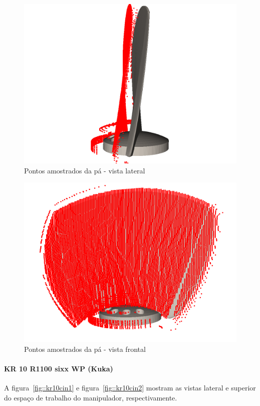 \begin{figure}[h!]	
	\includegraphics[width=\columnwidth]{figs/bighatch/amostrapa1.png}
	\caption{Pontos amostrados da pá - vista lateral}
	\label{fig::amostrapa1}
\end{figure}

\begin{figure}[h!]	
	\includegraphics[width=\columnwidth]{figs/bighatch/amostrapa2.png}
	\caption{Pontos amostrados da pá - vista frontal}
	\label{fig::amostrapa1}
\end{figure}

\paragraph{KR 10 R1100 sixx WP (Kuka)}
A figura~\ref{fig::kr10cin1} e figura~\ref{fig::kr10cin2} mostram as vistas
lateral e superior do espaço de trabalho do manipulador, respectivamente.

